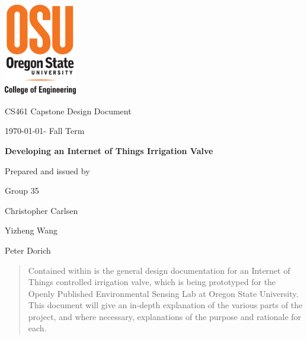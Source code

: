 \documentclass[onecolumn, draftclsnofoot,10pt, compsoc]{IEEEtran}
\def \CapstoneTeamName{     Group}
\def \CapstoneTeamNumber{       35}
\def \GroupMemberOne{           Christopher Carlsen}
\def \GroupMemberTwo{           Yizheng Wang}
\def \GroupMemberThree{         Peter Dorich}
\def \CapstoneProjectName{      Developing an Internet of Things Irrigation Valve}
\def \CapstoneSponsorCompany{       OSU \textbar\hspace{.05in} Openly Published Environmental Sensing (OPEnS) Lab}
\def \CapstoneSponsorPerson{        Chet Udell}
\def \DocType{      %
	Design Document
}
\newcommand{\NameSigPair}[1]{\par
	\makebox[2.75in][r]{#1} \hfil   \makebox[3.25in]{\makebox[2.25in]{\hrulefill} \hfill        \makebox[.75in]{\hrulefill}}
	\par\vspace{-12pt} \textit{\tiny\noindent
		\makebox[2.75in]{} \hfil        \makebox[3.25in]{\makebox[2.25in][r]{Signature} \hfill  \makebox[.75in][r]{Date}}}}
\renewcommand{\NameSigPair}[1]{#1}
\begin{document}
	\begin{titlepage}
		\begin{singlespace}
			\includegraphics[height=4cm]{coe_v_spot1}
			\hfill 
			\par\vspace{.2in}
			\centering
			\scshape{
				\huge CS461 Capstone \DocType \par
				{\large\today - Fall Term}\par
				\vspace{.5in}
				\textbf{\Huge\CapstoneProjectName}\par
				\vfill
				{\large Prepared and issued by }\par
				Group\CapstoneTeamNumber\par
				\vspace{5pt}
				{\Large
					\NameSigPair{\GroupMemberOne}\par
					\NameSigPair{\GroupMemberTwo}\par
					\NameSigPair{\GroupMemberThree}\par
				}
				\vspace{20pt}
			}
			\begin{abstract}
				Contained within is the general design documentation for an Internet of Things controlled irrigation valve, which is being prototyped for the Openly Published Environmental Sensing Lab at Oregon State University.
				This document will give an in-depth explanation of the various parts of the project, and where necessary, explanations of the purpose and rationale for each.
			\end{abstract}     
		\end{singlespace}
	\end{titlepage}
	\newpage
	\tableofcontents
	\clearpage
	
\end{document}
